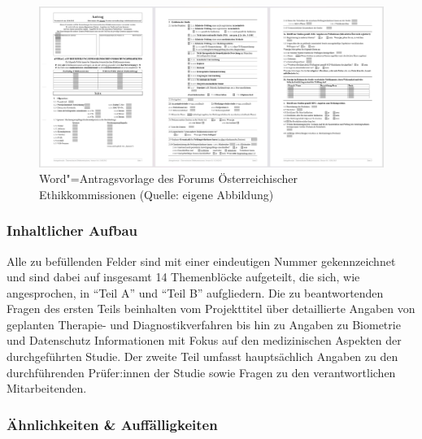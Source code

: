 \documentclass[a4paper,12pt,twoside]{scrreprt}
\begin{document}
\begin{figure}[ht]
    \centering
    \includegraphics[scale=0.21]{thesis/images/Luidold_Word-Vorlage-Forum-Oesterreichischer-Ethikkommissionen.png}
    \caption[Word"=Antragsvorlage des Forums Österreichischer Ethikkommissionen]{Word"=Antragsvorlage des Forums Österreichischer Ethikkommissionen (Quelle: eigene Abbildung)}
    \label{fig:dokumentenvorlage-föe}
\end{figure}

\subsubsection*{Inhaltlicher Aufbau}
\label{sub-sub-sec:föe-inhaltlicher-aufbau}

Alle zu befüllenden Felder sind mit einer eindeutigen Nummer gekennzeichnet und sind dabei auf insgesamt 14 Themenblöcke aufgeteilt, die sich, wie angesprochen, in \enquote{Teil A} und \enquote{Teil B} aufgliedern. Die zu beantwortenden Fragen des ersten Teils beinhalten vom Projekttitel über detaillierte Angaben von geplanten Therapie- und Diagnostikverfahren bis hin zu Angaben zu Biometrie und Datenschutz Informationen mit Fokus auf den medizinischen Aspekten der durchgeführten Studie. Der zweite Teil umfasst hauptsächlich Angaben zu den durchführenden Prüfer:innen der Studie sowie Fragen zu den verantwortlichen Mitarbeitenden.

\subsubsection*{Ähnlichkeiten \& Auffälligkeiten}
\label{sub-sub-sec:ähnlichkeiten-auffälligkeiten-föe}
\end{document}
